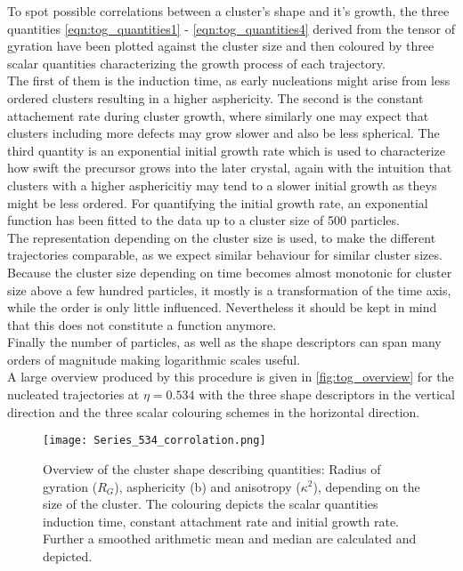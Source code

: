 To spot possible correlations between a cluster's shape and it's growth, the three quantities \autoref{eqn:tog_quantities1} - \ref{eqn:tog_quantities4} derived from the tensor of gyration have been plotted against the cluster size and then coloured by three scalar quantities characterizing the growth process of each trajectory.\\ 
The first of them is the induction time, as early nucleations might arise from less ordered clusters resulting in a higher asphericity. The second is the constant attachement rate during cluster growth, where similarly one may expect that clusters including more defects may grow slower and also be less spherical. The third quantity is an exponential initial growth rate which is used to characterize how swift the precursor grows into the later crystal, again with the intuition that clusters with a higher asphericitiy may tend to a slower initial growth as theys might be less ordered. For quantifying the initial growth rate, an exponential function has been fitted to the data up to a cluster size of 500 particles.\\
The representation depending on the cluster size is used, to make the different trajectories comparable, as we expect similar behaviour for similar cluster sizes. Because the cluster size depending on time becomes almost monotonic for cluster size above a few hundred particles, it mostly is a transformation of the time axis, while the order is only little influenced. Nevertheless it should be kept in mind that this does not constitute a function anymore.\\
Finally the number of particles, as well as the shape descriptors can span many orders of magnitude making logarithmic scales useful.\\

A large overview produced by this procedure is given in \autoref{fig:tog_overview} for the nucleated trajectories at $\eta=0.534$ with the three shape descriptors in the vertical direction and the three scalar colouring schemes in the horizontal direction.\\

\begin{figure}[!h]
\centering
\texttt{[image: Series\_534\_corrolation.png]}
\caption[Results of Tensor of Gyration quantities from production data]{Overview of the cluster shape describing quantities: Radius of gyration ($R_G$), asphericity (b) and anisotropy ($\kappa^2$), depending on the size of the cluster. The colouring depicts the scalar quantities induction time, constant attachment rate and initial growth rate. Further a smoothed arithmetic mean and median are calculated and depicted.}
\label{fig:tog_overview}
\end{figure}

